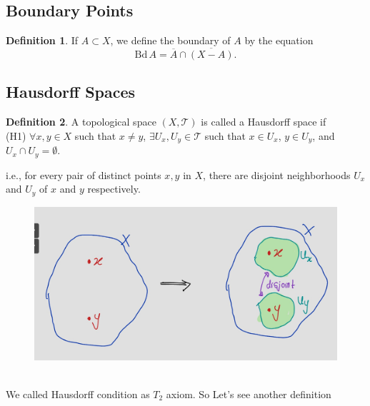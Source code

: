 \documentclass[
]{book}
\theoremstyle{definition}
\newtheorem{definition}{Definition}[chapter]
\theoremstyle{definition}
\theoremstyle{definition}
\theoremstyle{definition}
\theoremstyle{remark}
\begin{document}
\hypertarget{boundary-points}{%
\subsection{Boundary Points}\label{boundary-points}}

\begin{definition}
\protect\hypertarget{def:unnamed-chunk-75}{}\label{def:unnamed-chunk-75}If \(A \subset X\), we define the boundary of \(A\) by the equation
\[\text{Bd} \, A = \overline{A} \cap \overline{(X - A)}.\]
\end{definition}

\hypertarget{hausdorff-spaces}{%
\subsection{Hausdorff Spaces}\label{hausdorff-spaces}}

\begin{definition}
\protect\hypertarget{def:unnamed-chunk-76}{}\label{def:unnamed-chunk-76}A topological space \((X,\mathcal{T})\) is called a Hausdorff space if\\
(H1) \(\forall x,y \in X\) such that \(x \neq y\), \(\exists U_x, U_y \in \mathcal{T}\) such that \(x \in U_x\), \(y \in U_y\), and \(U_x \cap U_y = \emptyset\).

i.e., for every pair of distinct points \(x, y\) in \(X\), there are disjoint neighborhoods \(U_x\) and \(U_y\) of \(x\) and \(y\) respectively.
\end{definition}

\begin{figure}
\centering
\includegraphics{figures/figure 16.jpg}
\caption{\label{fig:fig16}\(~\)}
\end{figure}

We called Hausdorff condition as \(T_2\) axiom. So Let's see another definition
\end{document}
